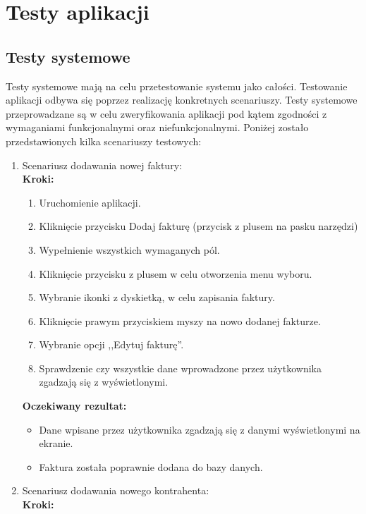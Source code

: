 \chapter{Testy aplikacji}
\section{Testy systemowe}
Testy systemowe mają na celu przetestowanie systemu jako całości. Testowanie aplikacji odbywa się poprzez realizację konkretnych scenariuszy. Testy systemowe przeprowadzane są w celu zweryfikowania aplikacji pod kątem zgodności z wymaganiami funkcjonalnymi oraz niefunkcjonalnymi. Poniżej zostało przedstawionych kilka scenariuszy testowych:
\\
\begin{enumerate}
    \item Scenariusz dodawania nowej faktury: \\
        \textbf{Kroki:}
        \begin{enumerate}
            \item Uruchomienie aplikacji.
            \item Kliknięcie przycisku Dodaj fakturę (przycisk z plusem na pasku narzędzi)
            \item Wypełnienie wszystkich wymaganych pól. 
            \item Kliknięcie przycisku z plusem w celu otworzenia menu wyboru.
            \item Wybranie ikonki z dyskietką, w celu zapisania faktury.
            \item Kliknięcie prawym przyciskiem myszy na nowo dodanej fakturze.
            \item Wybranie opcji ,,Edytuj fakturę''.
            \item Sprawdzenie czy wszystkie dane wprowadzone przez użytkownika zgadzają się z wyświetlonymi.
        \end{enumerate}
        \textbf{Oczekiwany rezultat:}
        \begin{itemize}
            \item Dane wpisane przez użytkownika zgadzają się z danymi wyświetlonymi na ekranie.
            \item Faktura została poprawnie dodana do bazy danych.\\
        \end{itemize}
    \item Scenariusz dodawania nowego kontrahenta: \\
        \textbf{Kroki:}

\end{enumerate}
